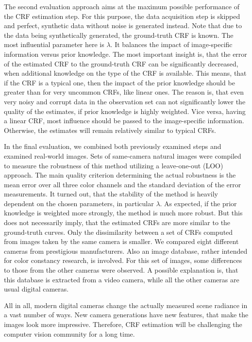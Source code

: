 The second evaluation approach aims at the maximum possible performance of the CRF estimation step. For this purpose, the data acquisition step is skipped and perfect, synthetic data without noise is generated instead. Note that due to the data being synthetically generated, the ground-truth CRF is known. The most influential parameter here is $\lambda$. It balances the impact of image-specific information versus prior knowledge. The most important insight is, that the error of the estimated CRF to the ground-truth CRF can be significantly decreased, when additional knowledge on the type of the CRF is available. This means, that if the CRF is a typical one, then the impact of the prior knowledge should be greater than for very uncommon CRFs, like linear ones. The reason is, that even very noisy and corrupt data in the observation set can not significantly lower the quality of the estimates, if prior knowledge is highly weighted. Vice versa, having a linear CRF, most influence should be passed to the image-specific information. Otherwise, the estimates will remain relatively similar to typical CRFs.

In the final evaluation, we combined both previously examined steps and examined real-world images. Sets of same-camera natural images were compiled to measure the robustness of this method utilizing a leave-one-out (LOO) approach. The main quality criterion determining the actual robustness is the mean error over all three color channels and the standard deviation of the error measurements. It turned out, that the stability of the method is heavily dependent on the chosen parameters, in particular $\lambda$. As expected, if the prior knowledge is weighted more strongly, the method is much more robust. But this does not necessarily imply, that the estimated CRFs are more similar to the ground-truth curves. Only the dissimilarity between a set of CRFs computed from images taken by the same camera is smaller. We compared eight different cameras from prestigious manufacturers. Also an image database, rather intended for color constancy research, is involved. For this set of images, some differences to those from the other cameras were observed. A possible explanation is, that this database is extracted from a video camera, while all the other cameras are usual digital cameras.

All in all, modern digital cameras change the actually measured scene radiance in a vast number of ways. New camera generations have new features, that make the images look more impressive. Therefore, CRF estimation will be challenging the computer vision community for a long time.